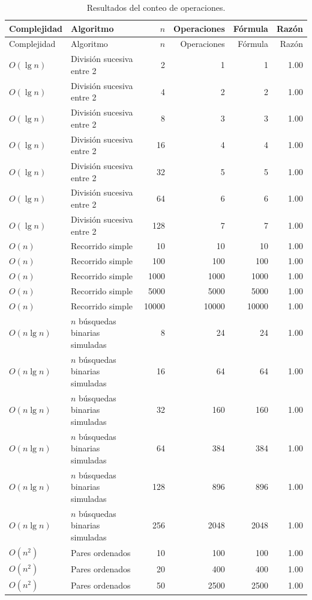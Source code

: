 \documentclass[12pt,letterpaper]{article}
\begin{document}
\begin{longtable}{p{} p{} r r r r}
\caption{Resultados del conteo de operaciones.}
\label{tab:resultados}\\
\toprule
Complejidad & Algoritmo & $n$ & Operaciones & Fórmula & Razón \\
\midrule
\endfirsthead
\toprule
Complejidad & Algoritmo & $n$ & Operaciones & Fórmula & Razón \\
\midrule
\endhead
$O(\lg n)$ & División sucesiva entre 2 & 2 & 1 & 1 & 1.00 \\
$O(\lg n)$ & División sucesiva entre 2 & 4 & 2 & 2 & 1.00 \\
$O(\lg n)$ & División sucesiva entre 2 & 8 & 3 & 3 & 1.00 \\
$O(\lg n)$ & División sucesiva entre 2 & 16 & 4 & 4 & 1.00 \\
$O(\lg n)$ & División sucesiva entre 2 & 32 & 5 & 5 & 1.00 \\
$O(\lg n)$ & División sucesiva entre 2 & 64 & 6 & 6 & 1.00 \\
$O(\lg n)$ & División sucesiva entre 2 & 128 & 7 & 7 & 1.00 \\
$O(n)$ & Recorrido simple & 10 & 10 & 10 & 1.00 \\
$O(n)$ & Recorrido simple & 100 & 100 & 100 & 1.00 \\
$O(n)$ & Recorrido simple & 1000 & 1000 & 1000 & 1.00 \\
$O(n)$ & Recorrido simple & 5000 & 5000 & 5000 & 1.00 \\
$O(n)$ & Recorrido simple & 10000 & 10000 & 10000 & 1.00 \\
$O(n\lg n)$ & $n$ búsquedas binarias simuladas & 8 & 24 & 24 & 1.00 \\
$O(n\lg n)$ & $n$ búsquedas binarias simuladas & 16 & 64 & 64 & 1.00 \\
$O(n\lg n)$ & $n$ búsquedas binarias simuladas & 32 & 160 & 160 & 1.00 \\
$O(n\lg n)$ & $n$ búsquedas binarias simuladas & 64 & 384 & 384 & 1.00 \\
$O(n\lg n)$ & $n$ búsquedas binarias simuladas & 128 & 896 & 896 & 1.00 \\
$O(n\lg n)$ & $n$ búsquedas binarias simuladas & 256 & 2048 & 2048 & 1.00 \\
$O(n^2)$ & Pares ordenados & 10 & 100 & 100 & 1.00 \\
$O(n^2)$ & Pares ordenados & 20 & 400 & 400 & 1.00 \\
$O(n^2)$ & Pares ordenados & 50 & 2500 & 2500 & 1.00 \\

\end{longtable}
\end{document}
